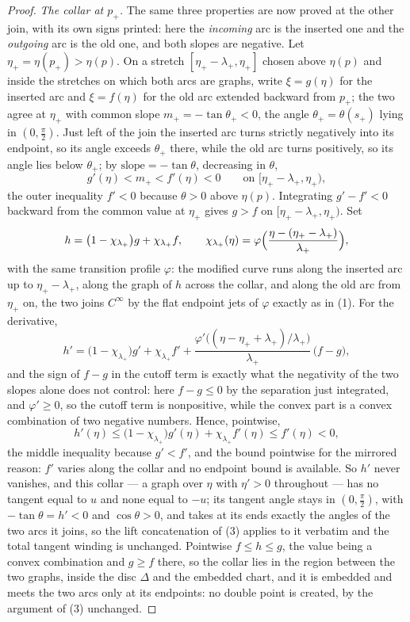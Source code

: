 \begin{proof}
\emph{The collar at $p_+$.} The same three properties are now proved at the
other join, with its own signs printed: here the \emph{incoming} arc is the
inserted one and the \emph{outgoing} arc is the old one, and both slopes are
negative. Let $\eta_+=\eta(p_+)>\eta(p)$. On a stretch
$[\eta_+-\lambda_+,\eta_+]$ chosen above $\eta(p)$ and inside the stretches
on which both arcs are graphs, write $\xi=g(\eta)$ for the inserted arc and
$\xi=f(\eta)$ for the old arc extended backward from $p_+$; the two agree at
$\eta_+$ with common slope $m_+=-\tan\theta_+<0$, the angle
$\theta_+=\theta(s_+)$ lying in $(0,\tfrac\pi2)$. Just left of the join the
inserted arc turns strictly negatively into its endpoint, so its angle
exceeds $\theta_+$ there, while the old arc turns positively, so its angle
lies below $\theta_+$; by $\text{slope}=-\tan\theta$, decreasing in
$\theta$,
\[
   g'(\eta)<m_+<f'(\eta)<0
   \qquad\text{on }[\eta_+-\lambda_+,\eta_+),
\]
the outer inequality $f'<0$ because $\theta>0$ above $\eta(p)$. Integrating
$g'-f'<0$ backward from the common value at $\eta_+$ gives $g>f$ on
$[\eta_+-\lambda_+,\eta_+)$. Set
\[
   h=\bigl(1-\chi_{\lambda_+}\bigr)g+\chi_{\lambda_+}f,
   \qquad
   \chi_{\lambda_+}(\eta)=\varphi\Bigl(\frac{\eta-(\eta_+-\lambda_+)}{\lambda_+}\Bigr),
\]
with the same transition profile $\varphi$: the modified curve runs along the
inserted arc up to $\eta_+-\lambda_+$, along the graph of $h$ across the
collar, and along the old arc from $\eta_+$ on, the two joins $C^\infty$ by
the flat endpoint jets of $\varphi$ exactly as in (1). For the derivative,
\[
   h'=\bigl(1-\chi_{\lambda_+}\bigr)g'+\chi_{\lambda_+}f'
      +\frac{\varphi'\bigl((\eta-\eta_++\lambda_+)/\lambda_+\bigr)}{\lambda_+}
       \,\bigl(f-g\bigr),
\]
and the sign of $f-g$ in the cutoff term is exactly what the negativity of
the two slopes alone does not control: here $f-g\leq0$ by the separation just
integrated, and $\varphi'\geq0$, so the cutoff term is nonpositive, while the
convex part is a convex combination of two negative numbers. Hence,
pointwise,
\[
   h'(\eta)\leq\bigl(1-\chi_{\lambda_+}\bigr)g'(\eta)+\chi_{\lambda_+}f'(\eta)
   \leq f'(\eta)<0 ,
\]
the middle inequality because $g'<f'$, and the bound pointwise for the
mirrored reason: $f'$ varies along the collar and no endpoint bound is
available. So $h'$ never vanishes, and this collar --- a graph over $\eta$
with $\eta'>0$ throughout --- has no tangent equal to $u$ and none equal to
$-u$; its tangent angle stays in $(0,\tfrac\pi2)$, with
$-\tan\theta=h'<0$ and $\cos\theta>0$, and takes at its ends exactly the
angles of the two arcs it joins, so the lift concatenation of (3) applies to
it verbatim and the total tangent winding is unchanged. Pointwise
$f\leq h\leq g$, the value being a convex combination and $g\geq f$ there, so
the collar lies in the region between the two graphs, inside the disc
$\Delta$ and the embedded chart, and it is embedded and meets the two arcs
only at its endpoints: no double point is created, by the argument of (3)
unchanged.


\end{proof}
